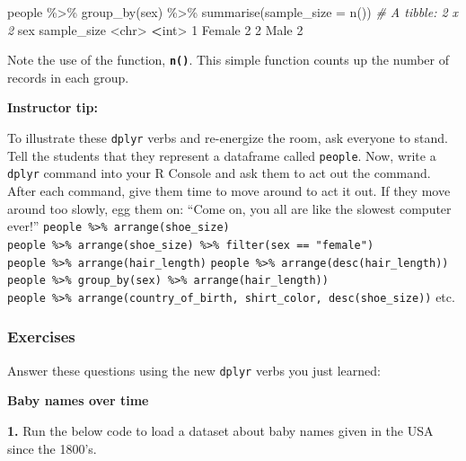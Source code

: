\documentclass[
]{book}
\newenvironment{Shaded}{\begin{snugshade}}{\end{snugshade}}
\newcommand{\AttributeTok}[1]{\textcolor[rgb]{0.77,0.63,0.00}{#1}}
\newcommand{\CommentTok}[1]{\textcolor[rgb]{0.56,0.35,0.01}{\textit{#1}}}
\newcommand{\DecValTok}[1]{\textcolor[rgb]{0.00,0.00,0.81}{#1}}
\newcommand{\ErrorTok}[1]{\textcolor[rgb]{0.64,0.00,0.00}{\textbf{#1}}}
\newcommand{\FunctionTok}[1]{\textcolor[rgb]{0.00,0.00,0.00}{#1}}
\newcommand{\NormalTok}[1]{#1}
\newcommand{\SpecialCharTok}[1]{\textcolor[rgb]{0.00,0.00,0.00}{#1}}
\begin{document}
\begin{Shaded}
\begin{Highlighting}[]
\NormalTok{people }\SpecialCharTok{\%\textgreater{}\%}
  \FunctionTok{group\_by}\NormalTok{(sex) }\SpecialCharTok{\%\textgreater{}\%}
  \FunctionTok{summarise}\NormalTok{(}\AttributeTok{sample\_size =} \FunctionTok{n}\NormalTok{())}
\CommentTok{\# A tibble: 2 x 2}
\NormalTok{  sex    sample\_size}
  \SpecialCharTok{\textless{}}\NormalTok{chr}\SpecialCharTok{\textgreater{}}        \ErrorTok{\textless{}}\NormalTok{int}\SpecialCharTok{\textgreater{}}
\DecValTok{1}\NormalTok{ Female           }\DecValTok{2}
\DecValTok{2}\NormalTok{ Male             }\DecValTok{2}
\end{Highlighting}
\end{Shaded}

Note the use of the function, \textbf{\texttt{n()}}. This simple function counts up the number of records in each group.

\leavevmode{}%
\textbf{Instructor tip:}

To illustrate these \texttt{dplyr} verbs and re-energize the room, ask everyone to stand. Tell the students that they represent a dataframe called \texttt{people}. Now, write a \texttt{dplyr} command into your R Console and ask them to act out the command. After each command, give them time to move around to act it out. If they move around too slowly, egg them on: ``Come on, you all are like the slowest computer ever!'' \texttt{people\ \%\textgreater{}\%\ arrange(shoe\_size)} \texttt{people\ \%\textgreater{}\%\ arrange(shoe\_size)\ \%\textgreater{}\%\ filter(sex\ ==\ "female")} \texttt{people\ \%\textgreater{}\%\ arrange(hair\_length)} \texttt{people\ \%\textgreater{}\%\ arrange(desc(hair\_length))} \texttt{people\ \%\textgreater{}\%\ group\_by(sex)\ \%\textgreater{}\%\ arrange(hair\_length))} \texttt{people\ \%\textgreater{}\%\ arrange(country\_of\_birth,\ shirt\_color,\ desc(shoe\_size))} etc.

\hypertarget{exercises-6}{%
\subsubsection*{Exercises}\label{exercises-6}}

Answer these questions using the new \texttt{dplyr} verbs you just learned:

\textbf{Baby names over time}

\textbf{1.} Run the below code to load a dataset about baby names given in the USA since the 1800's.
\end{document}
